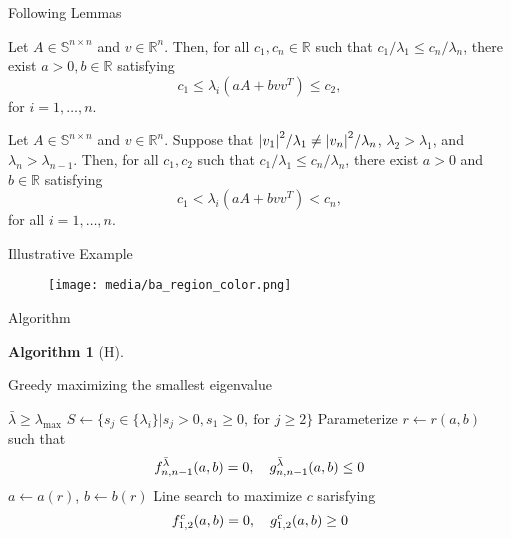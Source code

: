 \documentclass[handout]{beamer}
\theoremstyle{plain}
\theoremstyle{definition}
\newtheorem{algorithm}{Algorithm}
\theoremstyle{remark}
\newcommand{\MB}[1]{\mathbb{#1}}
\begin{document}
\begin{frame}{Following Lemmas}
	\begin{lemma}
		Let $A \in \MB{S}^{n \times n}$ and $v \in \MB{R}^n$. Then, for all $c_1,
		c_n \in \MB{R}$ such that $c_1/\lambda_1 \le c_n/\lambda_n$, there exist
		$a>0, b \in \MB{R}$ satisfying
		\begin{equation*}
			c_1 \le \lambda_i(a A + b v v^T) \le c_2,
		\end{equation*}
		for $i = 1, \dotsc, n$.
	\end{lemma}
	\pause

	\begin{lemma}
		Let $A \in \MB{S}^{n \times n}$ and $v \in \MB{R}^n$. Suppose that
		${\abs{v_1}^2}/{\lambda_1} \ne {\abs{v_n}^2}/{\lambda_n}$,
		$\lambda_2 > \lambda_1$, and $\lambda_n > \lambda_{n-1}$. Then, for all
		$c_1, c_2$ such that $c_1/\lambda_1 \le c_n/\lambda_n$, there exist $a > 0$
		and $b \in \MB{R}$ satisfying
		\begin{equation*}
			c_1 < \lambda_i(a A + b v v^T) < c_n,
		\end{equation*}
		for all $i = 1, \dotsc, n$.
	\end{lemma}
\end{frame}

\begin{frame}{Illustrative Example}
	\begin{figure}[h]
		\texttt{[image: media/ba\_region\_color.png]}
	\end{figure}
\end{frame}

\begin{frame}{Algorithm}
	\begin{algorithm}[H]
		\begin{algorithmic}[1]
			\caption{Greedy maximizing the smallest eigenvalue}
			\Require $\bar{\lambda} \ge \lambda_{\max}$
			\State $S \gets \{ s_j \in \{\lambda_i\} | s_j > 0, s_1 \ge 0,\ \text{for
			} j \ge 2 \}$
			\State Parameterize $r \gets r(a, b)$ such that
			\begin{equation*}
				f_{n, n-1}^{\bar{\lambda}}(a, b) = 0 \qc
				g_{n, n-1}^{\bar{\lambda}}(a, b) \le 0
			\end{equation*}
			\State $a \gets a(r)$, $b \gets b(r)$
			\State Line search to maximize $c$ sarisfying
			\begin{equation*}
				f_{1, 2}^c (a, b) = 0 \qc
				g_{1, 2}^c (a, b) \ge 0
			\end{equation*}
			\EndFor             
		\end{algorithmic}
	\end{algorithm}
\end{frame}
\end{document}
